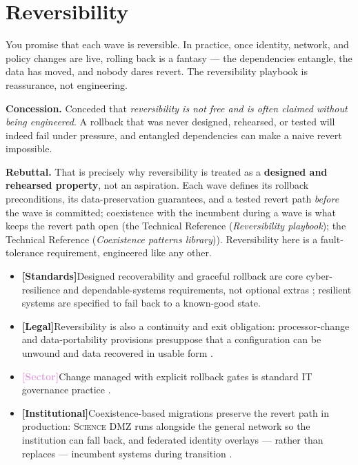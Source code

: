 \documentclass[11pt,a4paper,twoside]{book}
\let\citep\parencite
\newcommand{\keyword}[1]{\textbf{#1}}
\newcommand{\institution}[1]{\textsc{#1}}
\newcommand{\evlegal}{\textcolor{BrickRed}{\textbf{[Legal]}}\space}
\newcommand{\evstd}{\textcolor{NavyBlue}{\textbf{[Standards]}}\space}
\newcommand{\evsector}{\textcolor{Plum}{\textbf{[Sector]}}\space}
\newcommand{\evinst}{\textcolor{Slate}{\textbf{[Institutional]}}\space}
\newcommand{\trref}[1]{the Technical Reference (\emph{#1})}
\begin{document}
\section{Reversibility}
\label{sec:arg-reversibility}

\begin{questionbox}
You promise that each wave is reversible. In practice, once identity,
network, and policy changes are live, rolling back is a fantasy --- the
dependencies entangle, the data has moved, and nobody dares revert. The
reversibility playbook is reassurance, not engineering.
\end{questionbox}

\begin{answerbox}[Response O8.1]
\textbf{Concession.} Conceded that \emph{reversibility is not free and is
often claimed without being engineered}. A rollback that was never designed,
rehearsed, or tested will indeed fail under pressure, and entangled
dependencies can make a naive revert impossible.

\medskip
\textbf{Rebuttal.} That is precisely why reversibility is treated as a
\keyword{designed and rehearsed property}, not an aspiration. Each wave
defines its rollback preconditions, its data-preservation guarantees, and a
tested revert path \emph{before} the wave is committed; coexistence with the
incumbent during a wave is what keeps the revert path open
(\trref{Reversibility playbook}; \trref{Coexistence patterns library}).
Reversibility here is a fault-tolerance requirement, engineered like any
other.

\begin{itemize}[leftmargin=1.4em,itemsep=2pt]
  \item \evstd Designed recoverability and graceful rollback are core
        cyber-resilience and dependable-systems requirements, not optional
        extras \citep{nist-sp800-160v2,avizienis2004}; resilient systems are
        specified to fail back to a known-good state.
  \item \evlegal Reversibility is also a continuity and exit obligation:
        processor-change and data-portability provisions presuppose that a
        configuration can be unwound and data recovered in usable form
        \citep{gdpr,eu-sccs2021}.
  \item \evsector Change managed with explicit rollback gates is standard IT
        governance practice \citep{cobit,dehaes2015}.
  \item \evinst Coexistence-based migrations preserve the revert path in
        production: \institution{Science DMZ} runs alongside the general
        network so the institution can fall back, and federated identity
        overlays --- rather than replaces --- incumbent systems during
        transition
        \citep{science-dmz-2013,esnet-cases,mit-kerberos,umich-its}.
\end{itemize}


\end{answerbox}
\end{document}
